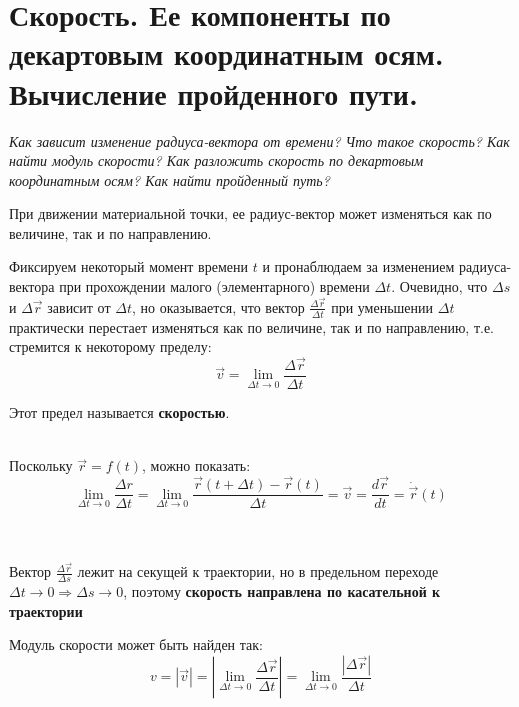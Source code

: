 \documentclass{article}
\begin{document}
  \section{Скорость. Ее компоненты по декартовым координатным осям. Вычисление пройденного пути.}
    \par
      \textit{Как зависит изменение радиуса-вектора от времени? Что такое скорость? Как найти модуль скорости? Как разложить скорость по декартовым координатным осям? Как найти пройденный путь?}\\
    \par
      При движении материальной точки, ее радиус-вектор может изменяться как по величине, так и по направлению.
    \par
      Фиксируем некоторый момент времени $t$ и пронаблюдаем за изменением радиуса-вектора при прохождении малого (элементарного) времени $\Delta t$. Очевидно, что $\Delta s$ и $\Delta \vec r$ зависит от $\Delta t$, но оказывается, что вектор $\frac{\Delta \vec r}{\Delta t}$ при уменьшении $\Delta t$ практически перестает изменяться как по величине, так и по направлению, т.е. стремится к некоторому пределу:
      \begin{equation}
	\vec v=\lim_{\Delta t\rightarrow 0}{\frac{\Delta \vec r}{\Delta t}}
      \end{equation}
     \par 
      Этот предел называется \textbf{скоростью}.
     \\\\
     \par
      Поскольку $\vec r = f(t)$, можно показать:
      \begin{equation}
	\lim_{\Delta t\rightarrow 0}{\frac{\Delta r}{\Delta t}}=\lim_{\Delta t\rightarrow 0}{\frac{\vec r(t+\Delta t)-\vec r(t)}{\Delta t}}=\vec v = \frac{d\vec r}{dt}=\dot{\vec r}(t)
      \end{equation}
     \\\\
     \par
      Вектор $\frac{\Delta \vec r}{\Delta s}$ лежит на секущей к траектории, но в предельном переходе $\Delta t\rightarrow 0 \Rightarrow \Delta s \rightarrow 0$, поэтому \textbf{скорость направлена по касательной к траектории}
     \par
      Модуль скорости может быть найден так:
      \begin{equation}
	v=|\vec v|=|\lim_{\Delta t\rightarrow 0}{\frac{\Delta \vec r}{\Delta t}}|=\lim_{\Delta t\rightarrow 0}{\frac{|\Delta \vec r|}{\Delta t}}
      \end{equation}
\end{document}
